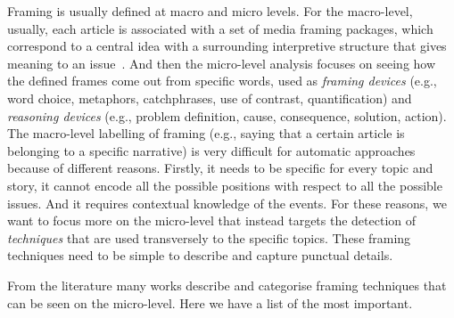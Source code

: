 
Framing is usually defined at macro and micro levels.
For the macro-level, usually, each article is associated with a set of media framing packages, which correspond to a central idea with a surrounding interpretive structure that gives meaning to an issue~\cite{gamson1989media}.
And then the micro-level analysis focuses on seeing how the defined frames come out from specific words, used as \textit{framing devices} (e.g., word choice, metaphors, catchphrases, use of contrast, quantification) and \textit{reasoning devices} (e.g., problem definition, cause, consequence, solution, action).
The macro-level labelling of framing (e.g., saying that a certain article is belonging to a specific narrative) is very difficult for automatic approaches because of different reasons. Firstly, it needs to be specific for every topic and story, it cannot encode all the possible positions with respect to all the possible issues. And it requires contextual knowledge of the events.
For these reasons, we want to focus more on the micro-level that instead targets the detection of \emph{techniques} that are used transversely to the specific topics. These framing techniques need to be simple to describe and capture punctual details.

From the literature many works describe and categorise framing techniques that can be seen on the micro-level. Here we have a list of the most important.

